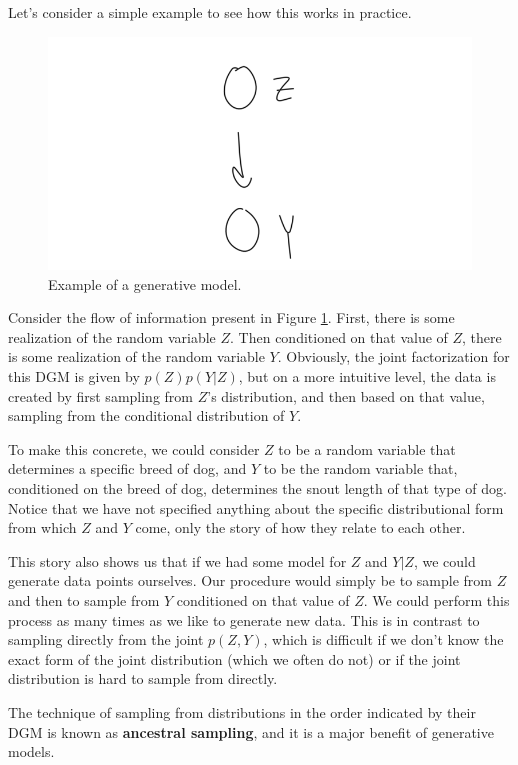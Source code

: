 Let's consider a simple example to see how this works in practice.
\begin{figure}
    \centering
    \includegraphics[width=0.5\paperwidth]{../GraphicalModels/fig/GenerativeRVExample.png}
    \caption{Example of a generative model.}
    \label{fig:generative-rv}
\end{figure}
Consider the flow of information present in Figure \ref{fig:generative-rv}. First, there is some realization of the random variable $Z$. Then conditioned on that value of $Z$, there is some realization of the random variable $Y$. Obviously, the joint factorization for this DGM is given by $p(Z)p(Y|Z)$, but on a more intuitive level, the data is created by first sampling from $Z$'s distribution, and then based on that value, sampling from the conditional distribution of $Y$.

To make this concrete, we could consider $Z$ to be a random variable that determines a specific breed of dog, and $Y$ to be the random variable that, conditioned on the breed of dog, determines the snout length of that type of dog. Notice that we have not specified anything about the specific distributional form from which $Z$ and $Y$ come, only the story of how they relate to each other.

This story also shows us that if we had some model for $Z$ and $Y|Z$, we could generate data points ourselves. Our procedure would simply be to sample from $Z$ and then to sample from $Y$ conditioned on that value of $Z$. We could perform this process as many times as we like to generate new data. This is in contrast to sampling directly from the joint $p(Z, Y)$, which is difficult if we don't know the exact form of the joint distribution (which we often do not) or if the joint distribution is hard to sample from directly.

The technique of sampling from distributions in the order indicated by their DGM is known as \textbf{ancestral sampling}, and it is a major benefit of generative models.

